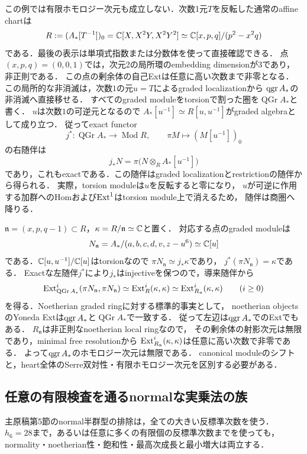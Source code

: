 \documentclass[11pt,a4paper]{ltjsarticle}
\begin{document}
\begin{remark}\label{rem:starsingularity}
この例では有限ホモロジー次元も成立しない．次数1元$T$を反転した通常のaffine chartは
\[
 R:=(A_*[T^{-1}])_0
 =\mathbb C[X,X^2Y,X^2Y^2]
 \simeq\mathbb C[x,p,q]/(p^2-x^2q)
\]
である．最後の表示は単項式指数または分数体を使って直接確認できる．
点$(x,p,q)=(0,0,1)$では，次元2の局所環のembedding dimensionが3であり，非正則である．
この点の剰余体の自己Extは任意に高い次数まで非零となる．
この局所的な非消滅は，次数$1$の元$u=T$によるgraded localizationから
$\operatorname{qgr} A_*$の非消滅へ直接移せる．
すべてのgraded moduleをtorsionで割った圏を$\operatorname{QGr}A_*$と書く．
$u$は次数$1$の可逆元となるので
$A_*[u^{-1}]\simeq R[u,u^{-1}]$がgraded algebraとして成り立つ．
従ってexact functor
\[
 j^*:\operatorname{QGr}A_*\longrightarrow\operatorname{Mod}R,
 \qquad \pi M\longmapsto(M[u^{-1}])_0
\]
の右随伴は
\[
 j_*N=\pi\bigl(N\otimes_R A_*[u^{-1}]\bigr)
\]
であり，これもexactである．この随伴はgraded localizationとrestrictionの随伴から得られる．
実際，torsion moduleは$u$を反転すると零になり，
$u$が可逆に作用する加群へのHomおよび$\operatorname{Ext}^1$はtorsion module上で消えるため，
随伴は商圏へ降りる．

$\mathfrak n=(x,p,q-1)\subset R$，$\kappa=R/\mathfrak n\simeq\mathbb C$と置く．
対応する点のgraded moduleは
\[
 N_{\mathfrak n}
 =A_* /(a,b,c,d,v,z-u^6)\simeq\mathbb C[u]
\]
である．$\mathbb C[u,u^{-1}]/\mathbb C[u]$はtorsionなので
$\pi N_{\mathfrak n}\simeq j_*\kappa$であり，
$j^*(\pi N_{\mathfrak n})=\kappa$である．
Exactな左随伴$j^*$により$j_*$はinjectiveを保つので，導来随伴から
\[
 \operatorname{Ext}^i_{\operatorname{QGr}A_*}
   (\pi N_{\mathfrak n},\pi N_{\mathfrak n})
 \simeq\operatorname{Ext}^i_R(\kappa,\kappa)
 \simeq\operatorname{Ext}^i_{R_{\mathfrak n}}(\kappa,\kappa)
 \qquad(i\geq0)
\]
を得る．Noetherian graded ringに対する標準的事実として，
noetherian objectsのYoneda Extは$\operatorname{qgr} A_*$と$\operatorname{QGr}A_*$で一致する．
従って左辺は$\operatorname{qgr} A_*$でのExtでもある．
$R_{\mathfrak n}$は非正則なnoetherian local ringなので\cite[Tag 065U]{Stacks}，
その剰余体の射影次元は無限であり，minimal free resolutionから
$\operatorname{Ext}^i_{R_{\mathfrak n}}(\kappa,\kappa)$は任意に高い次数で非零である．
よって$\operatorname{qgr} A_*$のホモロジー次元は無限である．
canonical moduleのシフトと，heart全体のSerre双対性・有限ホモロジー次元を区別する必要がある．
\end{remark}

\subsection{任意の有限検査を通るnormalな実乗法の族}
主原稿第5節のnormal半群型の排除は，全ての大きい反標準次数を使う．
$h_6=28$まで，あるいは任意に多くの有限個の反標準次数までを使っても，
normality・noetherian性・飽和性・最高次成長と最小増大は両立する．
\end{document}

